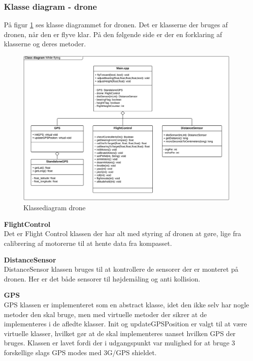 \newpage
\subsubsection*{Klasse diagram - drone}

På figur \ref{fig:classDiagram_drone_underflyvning} ses klasse diagrammet for dronen. Det er klasserne der bruges af dronen, når den er flyve klar. På den følgende side er der en forklaring af klasserne og deres metoder. 

\begin{figure}[H]
	\centering
	\includegraphics[width=1.1\textwidth]{Billeder/klasse_diagrammer/classdiagram_iteration2_fly.png}
	\vspace{0cm}
	\caption{Klassediagram drone}
	\label{fig:classDiagram_drone_underflyvning}
\end{figure}

\textbf{FlightControl} \\
Det er Flight Control klassen der har alt med styring af dronen at gøre, lige fra calibrering af motorerne til at hente data fra kompasset. 

\textbf{DistanceSensor} \\
DistanceSensor klassen bruges til at kontrollere de sensorer der er monteret på dronen. Her er det både sensorer til højdemåling og anti kollision. 

\textbf{GPS} \\
GPS klassen er implementeret som en abstract klasse, idet den ikke selv har nogle metoder den skal bruge, men med virtuelle metoder der sikrer at de implementeres i de afledte klasser. 
Init og updateGPSPosition er valgt til at være virtuelle klasser, hvilket gør at de skal implementeres uanset hvilken GPS der bruges. Klassen er lavet fordi der i udgangspunkt var mulighed for at bruge 3 forskellige slags GPS modes med 3G/GPS shieldet. 

